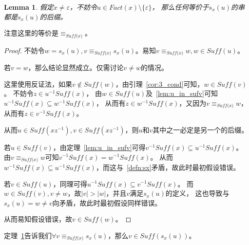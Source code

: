 \documentclass[UTF8]{ctexart}
\newtheorem{lem}[thm]{Lemma}
\theoremstyle{definition}
\theoremstyle{remark}
\numberwithin{equation}{subsection}
\newcommand{\equsuf}[1][x]{\equiv_{\textit{Suff(#1)}}}
\newcommand{\Suff}{\textit{Suff}}
\begin{document}
	\begin{lem}
	\label{lem:suf_sxu}
		假定$x \neq \varepsilon$，不妨令$u \in Fact(x) \setminus \{\varepsilon\}$，
		那么任何等价于$s_x(u)$的串都是$s_x(u)$的后缀。
	\end{lem}
	注意这里的等价是$\equsuf$。
	\begin{proof}
		不妨令$w = s_x(u), v \equsuf s_x(u)$。易知$v \equsuf w, w \in \Suff(u)$。
		
		若$v = w$，那么结论显然成立。仅需讨论$v \neq w$的情况。
		
		这里使用反证法，如果$v \notin \Suff(w)$，由引理~\ref{cor:3_cond}可知，$w \in \Suff(v)$。
		不妨令$z \in u^{-1} \Suff(x)$，
		由$w \in \Suff(u)$及~\ref{lem:u_in_sufv}可知$u^{-1} \Suff(x) \subseteq w^{-1} \Suff(x)$，
		从而有$z \in w^{-1} \Suff(x)$，又因为$v \equsuf w$，从而有$z \in v^{-1} \Suff(x)$。
		
		从而$u \in \Suff(xz^{-1}), v \in \Suff(xz^{-1})$，则$u$和$v$其中之一必定是另一个的后缀。
		
		若$u \in \Suff(v)$，由定理~\ref{lem:u_in_sufv}可得$v^{-1} \Suff(x) \subseteq u^{-1} \Suff(x)$。
		由$v \equsuf w$可知$v^{-1} \Suff(x) = w^{-1} \Suff(x)$。
		从而$w^{-1} \Suff(x) \subseteq u^{-1} \Suff(x)$，而这与~\ref{defn:sx}矛盾，故此时最初假设错误。
		
		若$v \in \Suff(u)$，同理可得$u^{-1} \Suff(x) \subseteq v^{-1} \Suff(x)$。
		而$w \in \Suff(v), v \neq w$，故$|v| > |w|$，并且$v$满足$s_x(u)$的定义，
		这也导致与$s_x(u) = w \neq v$向矛盾，故此时最初假设同样错误。
		
		从而易知假设错误，故$v \in \Suff(w)$。
	\end{proof}
	定理~\ref{lem:suf_sxu}告诉我们$\forall v \equsuf s_x(u)$，那么$v \in \Suff(s_x(u))$。
	
\end{document}
